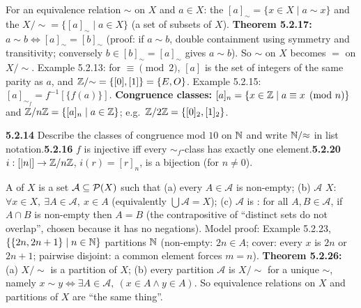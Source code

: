 \begin{key}
For an equivalence relation $\sim$ on $X$ and $a\in X$: the  $[a]_\sim=\{x\in X\mid a\sim x\}$ and the  $X/{\sim}=\{[a]_\sim\mid a\in X\}$ (a set of subsets of $X$). \textbf{Theorem 5.2.17:} $a\sim b\Leftrightarrow[a]_\sim=[b]_\sim$ (proof: if $a\sim b$, double containment using symmetry and transitivity; conversely $b\in[b]_\sim=[a]_\sim$ gives $a\sim b$). So $\sim$ on $X$ becomes $=$ on $X/{\sim}$. Example 5.2.13: for $\equiv\pmod2$, $[a]$ is the set of integers of the same parity as $a$, and $\mathbb{Z}/{\sim}=\{[0],[1]\}=\{E,O\}$. Example 5.2.15: $[a]_{\sim_f}=f^{-1}[\{f(a)\}]$. \textbf{Congruence classes:} $[a]_n=\{x\in\mathbb{Z}\mid a\equiv x\pmod n\}$ and $\mathbb{Z}/n\mathbb{Z}=\{[a]_n\mid a\in\mathbb{Z}\}$; e.g.\ $\mathbb{Z}/2\mathbb{Z}=\{[0]_2,[1]_2\}$.
\end{key}

\begin{trybox}[{5.2.14, 5.2.16, 5.2.20 \fO}]
\textbf{5.2.14} Describe the classes of congruence mod $10$ on $\mathbb{N}$ and write $\mathbb{N}/{\approx}$ in list notation.\quad \textbf{5.2.16} $f$ is injective iff every $\sim_f$-class has exactly one element.\quad \textbf{5.2.20} $i:[|n|]\to\mathbb{Z}/n\mathbb{Z}$, $i(r)=[r]_n$, is a bijection (for $n\ne0$). 
\end{trybox}

\begin{key}
A  of $X$ is a set $\mathcal A\subseteq\mathcal{P}(X)$ such that (a) every $A\in\mathcal A$ is non-empty; (b) $\mathcal A$  $X$: $\forall x\in X,\ \exists A\in\mathcal A,\ x\in A$ (equivalently $\bigcup\mathcal A=X$); (c) $\mathcal A$ is : for all $A,B\in\mathcal A$, if $A\cap B$ is non-empty then $A=B$ (the contrapositive of ``distinct sets do not overlap'', chosen because it has no negations). Model proof: Example 5.2.23, $\{\{2n,2n+1\}\mid n\in\mathbb{N}\}$ partitions $\mathbb{N}$ (non-empty: $2n\in A$; cover: every $x$ is $2n$ or $2n+1$; pairwise disjoint: a common element forces $m=n$). \textbf{Theorem 5.2.26:} (a) $X/{\sim}$ is a partition of $X$; (b) every partition $\mathcal A$ is $X/{\sim}$ for a unique $\sim$, namely $x\sim y\Leftrightarrow\exists A\in\mathcal A,\ (x\in A\wedge y\in A)$. So equivalence relations on $X$ and partitions of $X$ are ``the same thing''.
\end{key}

